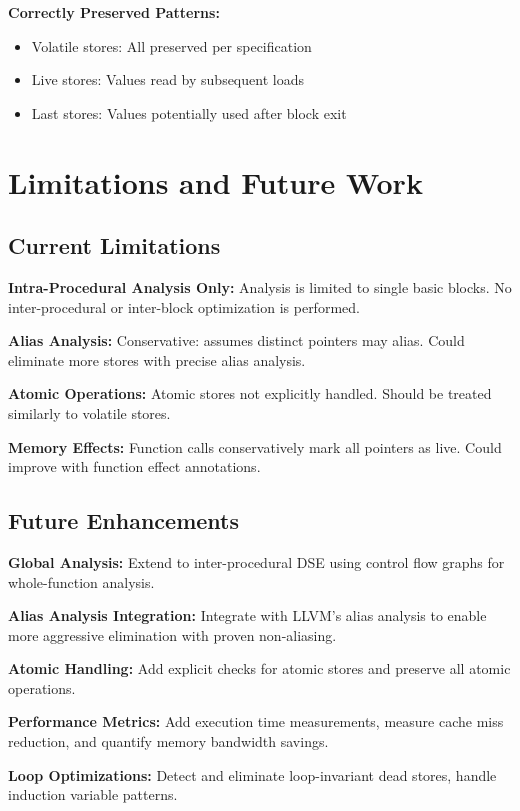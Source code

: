 \documentclass[journal]{IEEEtran}
\begin{document}
\textbf{Correctly Preserved Patterns:}
\begin{itemize}
\item Volatile stores: All preserved per specification
\item Live stores: Values read by subsequent loads
\item Last stores: Values potentially used after block exit
\end{itemize}

\section{Limitations and Future Work}

\subsection{Current Limitations}

\textbf{Intra-Procedural Analysis Only:} Analysis is limited to single basic blocks. No inter-procedural or inter-block optimization is performed.

\textbf{Alias Analysis:} Conservative: assumes distinct pointers may alias. Could eliminate more stores with precise alias analysis.

\textbf{Atomic Operations:} Atomic stores not explicitly handled. Should be treated similarly to volatile stores.

\textbf{Memory Effects:} Function calls conservatively mark all pointers as live. Could improve with function effect annotations.

\subsection{Future Enhancements}

\textbf{Global Analysis:} Extend to inter-procedural DSE using control flow graphs for whole-function analysis.

\textbf{Alias Analysis Integration:} Integrate with LLVM's alias analysis to enable more aggressive elimination with proven non-aliasing.

\textbf{Atomic Handling:} Add explicit checks for atomic stores and preserve all atomic operations.

\textbf{Performance Metrics:} Add execution time measurements, measure cache miss reduction, and quantify memory bandwidth savings.

\textbf{Loop Optimizations:} Detect and eliminate loop-invariant dead stores, handle induction variable patterns.
\end{document}
